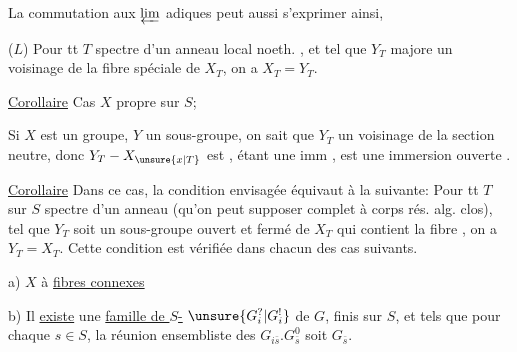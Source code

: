 
La commutation aux $\varprojlim$ adiques peut aussi s'exprimer ainsi,

($L$) Pour tt  $T$  spectre d'un anneau local noeth. , et tel que $Y_T$ majore un voisinage  de la fibre spéciale de $X_T$, on a  $X_T=Y_T$.

\uline{Corollaire} Cas $X$ propre sur $S$; 

Si $X$ est un groupe, $Y$ un sous-groupe, on sait que $Y_T$  un voisinage  de la section neutre, donc $Y_T-X_{\unsure{x|T}}$ est  ,  étant une imm , est une immersion ouverte . 


\uline{Corollaire} Dans ce cas, la condition envisagée équivaut à la suivante: Pour tt $T$ sur $S$ spectre d'un anneau  (qu'on peut supposer complet à corps rés. alg. clos), tel que $Y_T$ soit un sous-groupe ouvert et fermé de $X_T$ qui contient la fibre , on a $Y_T=X_T$. Cette condition est vérifiée dans chacun des cas suivants.

a) $X$ à \uline{fibres connexes}

b) Il \uline{existe} une \uline{famille de $S$-} $\unsure{G_i^?|G_i^!}$ de $G$, finis sur $S$, et tels que pour chaque $s\in S$, la réunion ensembliste des $G_{i\bar s}.G_{\bar s}^0$ soit $G_{\bar s}$.
